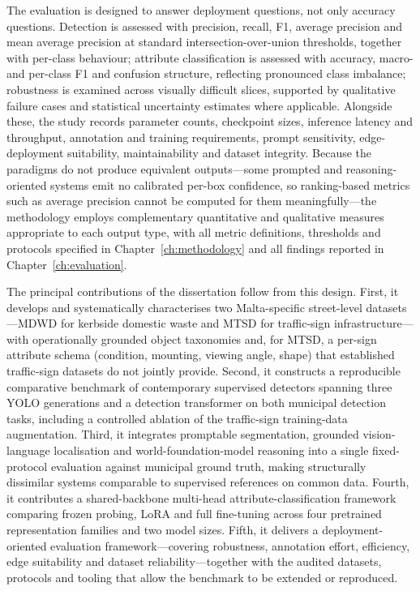 The evaluation is designed to answer deployment questions, not only accuracy questions. Detection is assessed with precision, recall, F1, average precision and mean average precision at standard intersection-over-union thresholds, together with per-class behaviour; attribute classification is assessed with accuracy, macro- and per-class F1 and confusion structure, reflecting pronounced class imbalance; robustness is examined across visually difficult slices, supported by qualitative failure cases and statistical uncertainty estimates where applicable. Alongside these, the study records parameter counts, checkpoint sizes, inference latency and throughput, annotation and training requirements, prompt sensitivity, edge-deployment suitability, maintainability and dataset integrity. Because the paradigms do not produce equivalent outputs---some prompted and reasoning-oriented systems emit no calibrated per-box confidence, so ranking-based metrics such as average precision cannot be computed for them meaningfully---the methodology employs complementary quantitative and qualitative measures appropriate to each output type, with all metric definitions, thresholds and protocols specified in Chapter~\ref{ch:methodology} and all findings reported in Chapter~\ref{ch:evaluation}.

The principal contributions of the dissertation follow from this design. First, it develops and systematically characterises two Malta-specific street-level datasets---MDWD for kerbside domestic waste and MTSD for traffic-sign infrastructure---with operationally grounded object taxonomies and, for MTSD, a per-sign attribute schema (condition, mounting, viewing angle, shape) that established traffic-sign datasets do not jointly provide. Second, it constructs a reproducible comparative benchmark of contemporary supervised detectors spanning three YOLO generations and a detection transformer on both municipal detection tasks, including a controlled ablation of the traffic-sign training-data augmentation. Third, it integrates promptable segmentation, grounded vision-language localisation and world-foundation-model reasoning into a single fixed-protocol evaluation against municipal ground truth, making structurally dissimilar systems comparable to supervised references on common data. Fourth, it contributes a shared-backbone multi-head attribute-classification framework comparing frozen probing, LoRA and full fine-tuning across four pretrained representation families and two model sizes. Fifth, it delivers a deployment-oriented evaluation framework---covering robustness, annotation effort, efficiency, edge suitability and dataset reliability---together with the audited datasets, protocols and tooling that allow the benchmark to be extended or reproduced.

